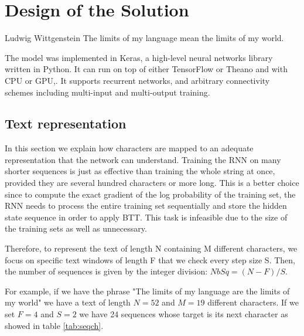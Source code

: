 \chapter{Design of the Solution}
\label{ch:design}

\begin{chapterquote}{Ludwig Wittgenstein}
	The limits of my language mean the limits of my world.
\end{chapterquote}

The model was implemented in Keras, a high-level neural networks library written in Python. It can run on top of either TensorFlow or Theano and with CPU or GPU,. It supports recurrent networks, and arbitrary connectivity schemes including multi-input and multi-output training. 

\section{Text representation}

In this section we explain how characters are mapped to an adequate representation that the network can understand. Training the RNN on many shorter sequences is just as effective than training the whole string at once, provided they are several hundred characters or more long. This is a better choice since to compute the exact gradient of the log probability of the training set, the RNN needs to process the entire training set sequentially and store the hidden state sequence in order to apply BTT. This task is infeasible due to the size of the training sets as well as unnecessary\cite{sutskever2011generating}.

 Therefore, to represent the text of length N containing M different characters, we focus on specific text windows of length F that we check every step size S. Then, the number of sequences is given by the integer division: $NbSq=(N-F)/S$. 

For example, if we have the phrase "The limits of my language are the limits of my world" we have a text of length $N=52$ and $M=19$ different characters. If we set $F=4$ and $S=2$ we have 24 sequences whose target is its next character as showed in table \ref{tab:seqch}.

